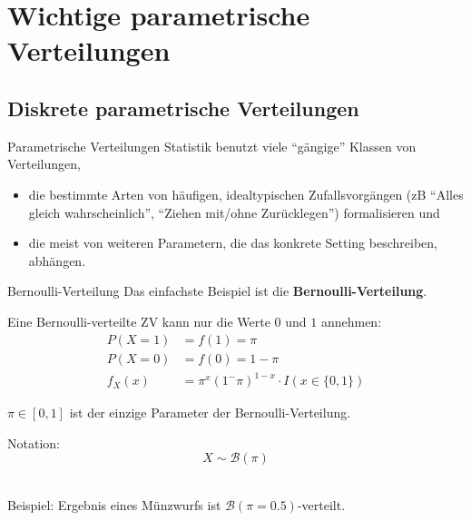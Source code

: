 \documentclass[
  10pt,
  ignorenonframetext,
]{beamer}
\providecommand{\tightlist}{%
  \setlength{\itemsep}{0pt}\setlength{\parskip}{0pt}}
\begin{document}
\section{Wichtige parametrische
Verteilungen}\label{wichtige-parametrische-verteilungen}

\subsection{Diskrete parametrische
Verteilungen}\label{diskrete-parametrische-verteilungen}

\begin{frame}{Parametrische Verteilungen}
\label{parametrische-verteilungen}
Statistik benutzt viele ``gängige'' Klassen von Verteilungen,

\begin{itemize}
\tightlist
\item
  die bestimmte Arten von häufigen, idealtypischen Zufallsvorgängen (zB
  ``Alles gleich wahrscheinlich'', ``Ziehen mit/ohne Zurücklegen'')
  formalisieren und
\item
  die meist von weiteren Parametern, die das konkrete Setting
  beschreiben, abhängen.
\end{itemize}
\end{frame}

\begin{frame}{Bernoulli-Verteilung}
\label{bernoulli-verteilung}
Das einfachste Beispiel ist die \textbf{Bernoulli-Verteilung}.

Eine Bernoulli-verteilte ZV kann nur die Werte \(0\) und \(1\) annehmen:
\begin{align*}
P(X = 1) & = f(1)  = \pi\\
P(X = 0) & = f(0)  = 1 - \pi \\
f_X(x) & = \pi^x (1^-\pi)^{1-x} \cdot I(x \in \{0, 1\})
\end{align*}

\(\pi \in [0, 1]\) ist der einzige Parameter der Bernoulli-Verteilung.~

Notation: \[X \sim {\mathcal B}(\pi)\]~

Beispiel: Ergebnis eines Münzwurfs ist
\({\mathcal B}(\pi = 0.5)\)-verteilt.

\end{frame}
\end{document}
